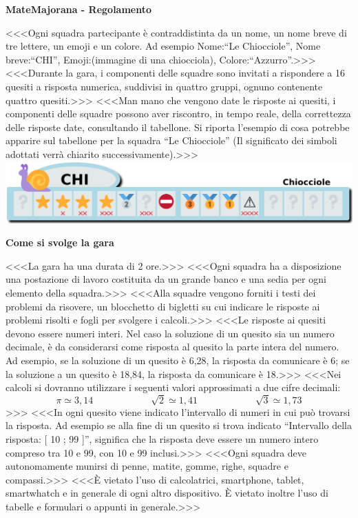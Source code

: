 \documentclass[12pt]{mcquiz}
\def\-#1{\qst <<<#1>>>}
\def\sec#1{\par{\bf\large#1}\par}
\def\tit#1{\par\begin{center}\bf\Large#1\end{center}\par}
\begin{document}
\tit{MateMajorana - Regolamento}
\-{Ogni squadra partecipante è contraddistinta da un nome, un nome breve di tre lettere, un emoji e un colore. Ad esempio Nome:``Le Chiocciole'', Nome breve:``CHI'', Emoji:(immagine di una chiocciola), Colore:``Azzurro''.}
\-{Durante la gara, i componenti delle squadre sono invitati a rispondere a 16 quesiti a risposta numerica, suddivisi in quattro gruppi, ognuno contenente quattro quesiti.}
\-{Man mano che vengono date le risposte ai quesiti, i componenti delle squadre possono aver riscontro, in tempo reale, della correttezza delle risposte date, consultando il tabellone. Si riporta l'esempio di cosa potrebbe apparire sul tabellone per la squadra ``Le Chiocciole'' (Il significato dei simboli adottati verrà chiarito successivamente).}
\includegraphics[width=\textwidth]{Esempio.png}
\sec{Come si svolge la gara}
\-{La gara ha una durata di 2 ore.}
\-{Ogni squadra ha a disposizione una postazione di lavoro costituita da un grande banco e una sedia per ogni elemento della squadra.}
\-{Alla squadre vengono forniti i testi dei problemi da risovere, un blocchetto di bigletti su cui indicare le risposte ai problemi risolti e fogli per svolgere i calcoli.}
\-{Le risposte ai quesiti devono essere numeri interi. Nel caso la soluzione di un quesito sia un numero decimale, è da considerarsi come risposta al quesito la parte intera del numero. Ad esempio, se la soluzione di un quesito è 6,28, la risposta da comunicare è 6; se la soluzione a un quesito è 18,84, la risposta da comunicare è 18.}
\-{Nei calcoli si dovranno utilizzare i seguenti valori approssimati a due cifre decimali:\vspace{-.3cm}\\ $$\pi\simeq3,14\qquad\qquad\qquad\sqrt{2}\simeq1,41\qquad\qquad\qquad\sqrt{3}\simeq1,73$$}
\-{In ogni quesito viene indicato l'intervallo di numeri in cui può trovarsi la risposta. Ad esempio se alla fine di un quesito si trova indicato ``Intervallo della risposta: [ 10 ; 99 ]'', significa che la risposta deve essere un numero intero compreso tra 10 e 99, con 10 e 99 inclusi.}
\-{Ogni squadra deve autonomamente munirsi di penne, matite, gomme, righe, squadre e compassi.}
\-{\`E vietato l'uso di calcolatrici, smartphone, tablet, smartwhatch e in generale di ogni altro dispositivo. \`E vietato inoltre l'uso di tabelle e formulari o appunti in generale.}
\end{document}
